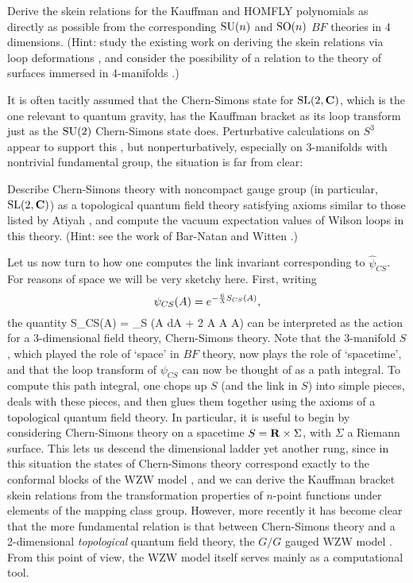 \begin{problem} \et Derive the skein relations for the Kauffman and
HOMFLY polynomials as directly as possible from the corresponding
${\rm SU}(n)$ and ${\rm SO}(n)$ $BF$ theories in 4 dimensions.  (Hint: study the
existing work on deriving the skein relations via loop deformations
\cite{Bruegmann2}, and consider the possibility of a relation to the
theory of surfaces immersed in 4-manifolds \cite{CM}.)  \end{problem}

It is often tacitly assumed that the Chern-Simons state for ${\rm SL}(2,{\bf C})$,
which is the one relevant to quantum gravity, has the Kauffman bracket
as its loop transform just as the ${\rm SU}(2)$ Chern-Simons state does.
Perturbative calculations on $S^3$ appear to support this
\cite{BarNatan2}, but nonperturbatively, especially on 3-manifolds with
nontrivial fundamental group, the situation is far from clear:

\begin{problem} \et  Describe Chern-Simons theory with noncompact
gauge group (in particular, ${\rm SL}(2,{\bf C})$) as a topological
quantum field theory satisfying axioms similar to those listed by Atiyah
\cite{Atiyah}, and compute the vacuum expectation values of
Wilson loops in this theory.  (Hint: see the work of Bar-Natan and Witten
\cite{BW,Witten4}.)  \end{problem}

Let us now turn to how one computes the link invariant
corresponding to $\hat \psi_{CS}$.  For reasons of space we will be
very sketchy here.  First, writing
\[      \psi_{CS}(A) = e^{-{6\over\Lambda} S_{CS}(A)}  ,\]
the quantity
\be      S_{CS}(A) = \int_S \tr(A \we dA + {2} A \we A \we A)
\ee
can be interpreted as the action for a 3-dimensional field theory,
Chern-Simons theory.  Note that the 3-manifold $S$, which played the
role of `space' in $BF$ theory, now plays the role of `spacetime', and
that the loop transform of $\psi_{CS}$ can now be thought of as a path
integral.  To compute this path integral, one chops up $S$ (and the link
in $S$) into simple pieces, deals with these pieces, and then glues them
together using the axioms of a topological quantum field theory.  In
particular, it is useful to begin by considering Chern-Simons theory on
a spacetime $S = {\bf R} \times \Sigma$, with $\Sigma$ a Riemann surface.
This lets us descend the dimensional ladder yet another rung, since in
this situation the states of Chern-Simons theory correspond exactly to
the conformal blocks of the WZW model \cite{Witten2}, and we can derive
the Kauffman bracket skein relations from the transformation properties
of $n$-point functions under elements of the mapping class group.
However, more recently it has become clear that the more fundamental
relation is that between Chern-Simons theory and a 2-dimensional {\it
topological} quantum field theory, the $G/G$ gauged WZW model
\cite{BT2}.  From this point of view, the WZW model itself serves mainly
as a computational tool.

